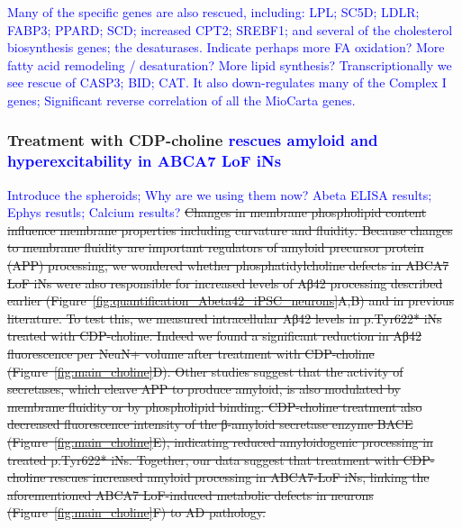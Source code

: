 \textcolor{blue}{Many of the specific genes are also rescued, including:  LPL; SC5D; LDLR; FABP3; PPARD; SCD; increased CPT2; SREBF1; and several of the cholesterol biosynthesis genes; the desaturases. Indicate perhaps more FA oxidation? More fatty acid remodeling / desaturation? More lipid synthesis? Transcriptionally we see rescue of CASP3; BID; CAT. It also down-regulates many of the Complex I genes; Significant reverse correlation of all the MioCarta genes.}

\subsubsection{Treatment with CDP-choline \textcolor{blue}{rescues amyloid and hyperexcitability in ABCA7 LoF iNs}}
\textcolor{blue}{Introduce the spheroids; Why are we using them now? Abeta ELISA results; Ephys resutls; Calcium results?}
\sout{Changes in membrane phospholipid content influence membrane properties including curvature and fluidity\cite{Van_der_Veen2017-pj}. Because changes to membrane fluidity are important regulators of amyloid precursor protein (APP) processing\cite{Bharadwaj2018-yu,Yang2014-vl}, we wondered whether phosphatidylcholine defects in ABCA7 LoF iNs were also responsible for increased levels of Aβ42 processing described earlier (Figure~\ref{fig:quantification_Abeta42_iPSC_neurons}A,B) and in previous literature\cite{Satoh2015-yu,Sakae2016-uy,Chan2008-qu,Bamji-Mirza2018-xt}. To test this, we measured intracellular Aβ42 levels in p.Tyr622* iNs treated with CDP-choline. Indeed we found a significant reduction in Aβ42 fluorescence per NeuN+ volume after treatment with CDP-choline (Figure~\ref{fig:main_choline}D). Other studies suggest that the activity of secretases, which cleave APP to produce amyloid, is also modulated by membrane fluidity or by phospholipid binding\cite{Walter2013-qu,Takasugi2011-iq,Kalvodova2005-kb}. CDP-choline treatment also decreased fluorescence intensity of the β-amyloid secretase enzyme BACE (Figure~\ref{fig:main_choline}E), indicating reduced amyloidogenic processing in treated p.Tyr622* iNs. Together, our data suggest that treatment with CDP-choline rescues increased amyloid processing in ABCA7-LoF iNs, linking the aforementioned ABCA7 LoF-induced metabolic defects in neurons (Figure~\ref{fig:main_choline}F) to AD pathology.}  

